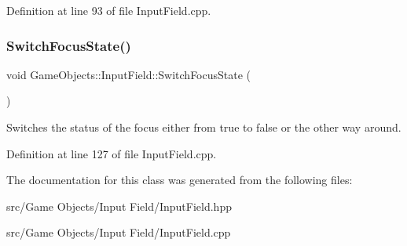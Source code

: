 Definition at line 93 of file Input\+Field.\+cpp.


\begin{DoxyCode}{0}

\end{DoxyCode}
\mbox{\label{class_game_objects_1_1_input_field_ab0e12850c9da42c7de085e8c73dd8de1}} 
\subsubsection{\texorpdfstring{SwitchFocusState()}{SwitchFocusState()}}
{\footnotesize\ttfamily void Game\+Objects\+::\+Input\+Field\+::\+Switch\+Focus\+State (\begin{DoxyParamCaption}{ }\end{DoxyParamCaption})}



Switches the status of the focus either from true to false or the other way around. 

\begin{DoxyVerb}\end{DoxyVerb}
 

Definition at line 127 of file Input\+Field.\+cpp.


\begin{DoxyCode}{0}

\end{DoxyCode}


The documentation for this class was generated from the following files\+:\begin{DoxyCompactItemize}
\item 
src/\+Game Objects/\+Input Field/Input\+Field.\+hpp\item 
src/\+Game Objects/\+Input Field/Input\+Field.\+cpp\end{DoxyCompactItemize}
